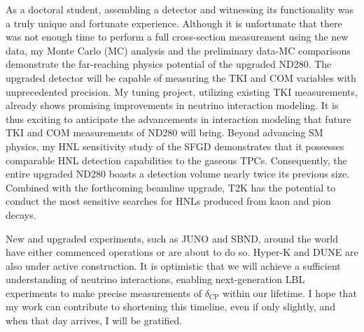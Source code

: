 As a doctoral student, assembling a detector and witnessing its functionality was a truly unique and fortunate experience.
Although it is unfortunate that there was not enough time to perform a full cross-section measurement using the new data, my Monte Carlo (MC) analysis and the preliminary data-MC comparisons demonstrate the far-reaching physics potential of the upgraded ND280.
The upgraded detector will be capable of measuring the TKI and COM variables with unprecedented precision.
My tuning project, utilizing existing TKI measurements, already shows promising improvements in neutrino interaction modeling.
It is thus exciting to anticipate the advancements in interaction modeling that future TKI and COM measurements of ND280 will bring.
Beyond advancing SM physics, my HNL sensitivity study of the SFGD demonstrates that it possesses comparable HNL detection capabilities to the gaseous TPCs.
Consequently, the entire upgraded ND280 boasts a detection volume nearly twice its previous size.
Combined with the forthcoming beamline upgrade, T2K has the potential to conduct the most sensitive searches for HNLs produced from kaon and pion decays.

New and upgraded experiments, such as JUNO and SBND, around the world have either commenced operations or are about to do so.
Hyper-K and DUNE are also under active construction.
It is optimistic that we will achieve a sufficient understanding of neutrino interactions, enabling next-generation LBL experiments to make precise measurements of $\delta_{\text{CP}}$ within our lifetime.
I hope that my work can contribute to shortening this timeline, even if only slightly, and when that day arrives, I will be gratified.